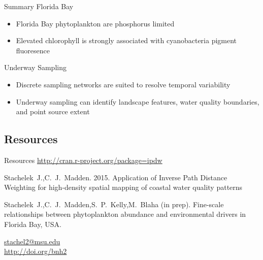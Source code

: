 \documentclass[compress,noflama,nosectionpages]{beamer}
\begin{document}
\begin{frame}{Summary}
\large
Florida Bay
\begin{itemize}
\item{Florida Bay phytoplankton are phosphorus limited}
\vspace{6pt}
\item{Elevated chlorophyll is strongly associated with cyanobacteria pigment fluoresence}
\end{itemize}

Underway Sampling
\begin{itemize}
\item{Discrete sampling networks are suited to resolve temporal variability}
\vspace{6pt}
\item{Underway sampling can identify landscape features, water quality boundaries, and point source extent}
\end{itemize}

\end{frame}

\subsection{Resources}
\begin{frame}{Resources}
  \centering
  \url{http://cran.r-project.org/package=ipdw}
  \begin{thebibliography}{10}
  \beamertemplatearticlebibitems
	Stachelek~J.,C.~J.~Madden. 2015. Application of Inverse Path Distance Weighting for high-density spatial mapping of coastal water quality patterns
	\newblock {}
	
	Stachelek~J.,C.~J.~Madden,S.~P.~Kelly,M.~Blaha (in prep). Fine-scale relationships between phytoplankton abundance and environmental drivers in Florida Bay, USA.
  \end{thebibliography}
  
  \vspace{3pt}
	\begin{center}
	\url{stachel2@msu.edu}\\
	\url{http://doi.org/bnh2}
	\end{center}
	\vspace{3pt}

\end{frame}
\end{document}
